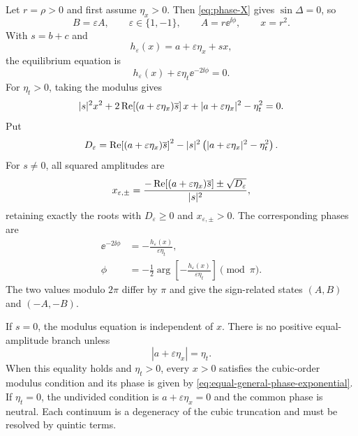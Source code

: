 Let $r=\rho>0$ and first assume $\eta_x>0$. Then
\eqref{eq:phase-X} gives $\sin\Delta=0$, so
\begin{equation}
 B=\varepsilon A,\qquad \varepsilon\in\{1,-1\},\qquad
 A=r\ee^{\ii\phi},\qquad x=r^2.
 \label{eq:equal-general-phase-ansatz}
\end{equation}
With $s=b+c$ and
\begin{equation}
 h_\varepsilon(x)=a+\varepsilon\eta_x+sx,
 \label{eq:equal-h}
\end{equation}
the equilibrium equation is
\begin{equation}
 h_\varepsilon(x)+\varepsilon\eta_t\ee^{-2\ii\phi}=0.
 \label{eq:equal-general-phase-balance}
\end{equation}
For $\eta_t>0$, taking the modulus gives
\begin{equation}
 |s|^2x^2+2\operatorname{Re}\!\left[
 (a+\varepsilon\eta_x)\overline s\right]x
 +|a+\varepsilon\eta_x|^2-\eta_t^2=0.
 \label{eq:equal-general-phase-quadratic}
\end{equation}
Put
\begin{equation}
 D_\varepsilon=
 \operatorname{Re}\!\left[(a+\varepsilon\eta_x)\overline s\right]^2
 -|s|^2\left(|a+\varepsilon\eta_x|^2-\eta_t^2\right).
 \label{eq:equal-general-phase-discriminant}
\end{equation}
For $s\ne0$, all squared amplitudes are
\begin{equation}
 x_{\varepsilon,\pm}=
 \frac{-\operatorname{Re}[(a+\varepsilon\eta_x)\overline s]
 \pm\sqrt{D_\varepsilon}}{|s|^2},
 \label{eq:equal-general-phase-roots}
\end{equation}
retaining exactly the roots with $D_\varepsilon\geq0$ and
$x_{\varepsilon,\pm}>0$. The corresponding phases are
\begin{align}
 \ee^{-2\ii\phi}
 &=-\frac{h_\varepsilon(x)}{\varepsilon\eta_t},
 \label{eq:equal-general-phase-exponential}\\
 \phi&=-\frac12\arg\!\left[
 -\frac{h_\varepsilon(x)}{\varepsilon\eta_t}\right]\pmod{\pi}.
 \label{eq:equal-general-phase-angle}
\end{align}
The two values modulo $2\pi$ differ by $\pi$ and give the sign-related
states $(A,B)$ and $(-A,-B)$.

If $s=0$, the modulus equation is independent of $x$.  There is no positive
equal-amplitude branch unless
\begin{equation}
 |a+\varepsilon\eta_x|=\eta_t.
 \label{eq:equal-degenerate-condition}
\end{equation}
When this equality holds and $\eta_t>0$, every $x>0$ satisfies the
cubic-order modulus condition and its phase is given by
\eqref{eq:equal-general-phase-exponential}.  If $\eta_t=0$, the undivided
condition is $a+\varepsilon\eta_x=0$ and the common phase is neutral.  Each
continuum is a degeneracy of the cubic truncation and must be resolved by
quintic terms.

